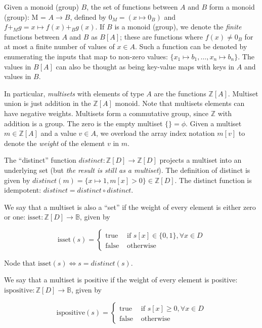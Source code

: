 \documentclass[10pt]{article}
\newcommand{\Z}{\mathbb{Z}}  %
\newcommand{\B}{\mathbb{B}}  %
\newcommand{\distinct}{\mathit{distinct}}  %
\newcommand{\isset}{\mbox{isset}}
\newcommand{\ispositive}{\mbox{ispositive}}
\begin{document}
Given a monoid (group) $B$, the set of functions between $A$ and $B$
form a monoid (group): M = $A \rightarrow B$, defined by $0_M = (x
\mapsto 0_B)$ and $f +_M g = x \mapsto f(x) +_B g(x)$.  If $B$ is a
monoid (group), we denote the \emph{finite} functions between $A$ and
$B$ as $B[A]$; these are functions where $f(x) \not= 0_B$ for at most
a finite number of values of $x \in A$.  Such a function can be
denoted by enumerating the inputs that map to non-zero values: $\{ x_1
\mapsto b_1, \dots, x_n \mapsto b_n \}$.  The values in $B[A]$ can
also be thought as being key-value maps with keys in $A$ and values in
$B$.

In particular, \emph{multisets} with elements of type $A$ are the
functions $\Z[A]$.  Multiset union is just addition in the $\Z[A]$
monoid.  Note that multisets elements can have negative weights.
Multisets form a commutative group, since $\Z$ with addition is a
group.  The zero is the empty multiset $\{\} = \phi$.  Given a
multiset $m \in \Z[A]$ and a value $v \in A$, we overload the array
index notation $m[v]$ to denote the \emph{weight} of the element $v$
in $m$.

The ``distinct'' function $\distinct: \Z[D] \rightarrow \Z[D]$
projects a multiset into an underlying set (but \emph{the result is
  still as a multiset}).  The definition of distinct is given by
$\distinct(m) = \{ x \mapsto 1, m[x] > 0 \} \in \Z[D]$.  The distinct
function is idempotent: $\distinct = \distinct \circ \distinct$.

We say that a multiset is also a ``set'' if the weight of every
element is either zero or one: $\isset : \Z[D] \rightarrow \B$,
given by

$$\isset(s) = \left\{
\begin{array}{ll}
  \mbox{true} & \mbox{ if } s[x] \in \{ 0, 1 \}, \forall x \in D \\
  \mbox{false} & \mbox{ otherwise}
\end{array}
\right.$$

Node that $\isset(s) \iff s = \distinct(s)$.

We say that a multiset is positive if the weight of every element is
positive: $\ispositive : \Z[D] \rightarrow \B$, given by

$$\ispositive(s) = \left\{
\begin{array}{ll}
  \mbox{true} & \mbox{ if } s[x] \geq 0, \forall x \in D \\
  \mbox{false} & \mbox{ otherwise}
\end{array}
\right.$$
\end{document}
